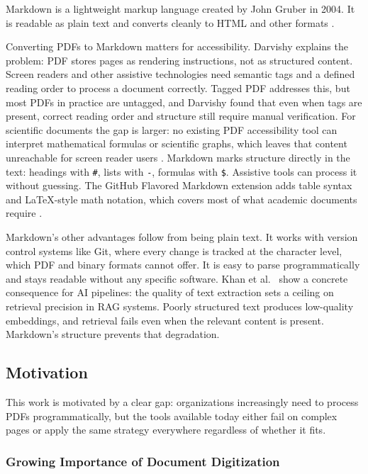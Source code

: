 \documentclass[12pt]{article}
\begin{document}
Markdown is a lightweight markup language created by John Gruber in 2004.
It is readable as plain text and converts cleanly to HTML and other formats
\cite{cone2019}.

Converting PDFs to Markdown matters for accessibility. Darvishy
\cite{darvishy2018} explains the problem: PDF stores pages as rendering
instructions, not as structured content. Screen readers and other assistive
technologies need semantic tags and a defined reading order to process a
document correctly. Tagged PDF addresses this, but most PDFs in practice are
untagged, and Darvishy found that even when tags are present, correct reading
order and structure still require manual verification. For scientific documents
the gap is larger: no existing PDF accessibility tool can interpret
mathematical formulas or scientific graphs, which leaves that content
unreachable for screen reader users \cite{darvishy2018}. Markdown marks structure directly in the text: headings with \texttt{\#},
lists with \texttt{-}, formulas with \texttt{\$}. Assistive tools can
process it without guessing. The GitHub Flavored Markdown extension adds table syntax and
\LaTeX-style math notation, which covers most of what academic documents
require \cite{duan2025}.

Markdown's other advantages follow from being plain text. It works with
version control systems like Git, where every change is tracked at the
character level, which PDF and binary formats cannot offer. It is easy to
parse programmatically and stays readable without any specific software.
Khan et al.\ \cite{khan2024} show a concrete consequence for AI pipelines:
the quality of text extraction sets a ceiling on retrieval precision in RAG
systems. Poorly structured text produces low-quality embeddings, and retrieval
fails even when the relevant content is present. Markdown's structure prevents
that degradation.

\subsection{Motivation}

This work is motivated by a clear gap: organizations increasingly need to
process PDFs programmatically, but the tools available today either fail on
complex pages or apply the same strategy everywhere regardless of whether it
fits.

\subsubsection{Growing Importance of Document Digitization}
\end{document}
